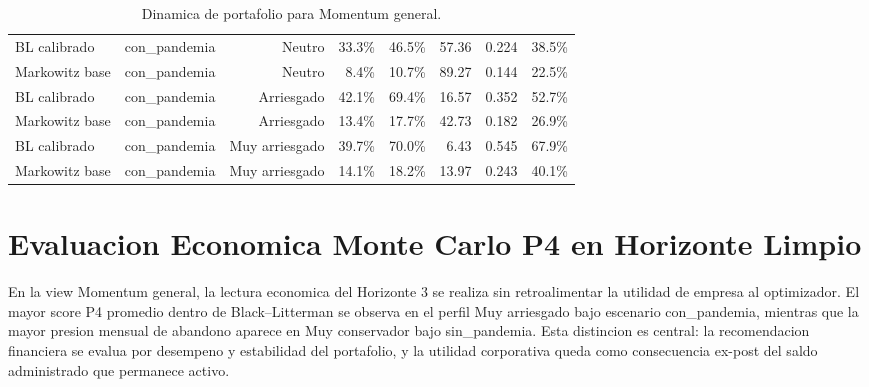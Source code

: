 \documentclass[11pt]{article}
\begin{document}
\begin{table}[H]
{\begin{tabular}{lrrrrrrr}
BL calibrado & con\_pandemia & Neutro & 33.3\% & 46.5\% & 57.36 & 0.224 & 38.5\% \\
Markowitz base & con\_pandemia & Neutro & 8.4\% & 10.7\% & 89.27 & 0.144 & 22.5\% \\
BL calibrado & con\_pandemia & Arriesgado & 42.1\% & 69.4\% & 16.57 & 0.352 & 52.7\% \\
Markowitz base & con\_pandemia & Arriesgado & 13.4\% & 17.7\% & 42.73 & 0.182 & 26.9\% \\
BL calibrado & con\_pandemia & Muy arriesgado & 39.7\% & 70.0\% & 6.43 & 0.545 & 67.9\% \\
Markowitz base & con\_pandemia & Muy arriesgado & 14.1\% & 18.2\% & 13.97 & 0.243 & 40.1\% \\
\bottomrule
\end{tabular}
}
\caption{Dinamica de portafolio para Momentum general.}
\label{tab:dinamica_momentum_general_v1_plus}
\end{table}


\section{Evaluacion Economica Monte Carlo P4 en Horizonte Limpio}

En la view Momentum general, la lectura economica del Horizonte 3 se realiza sin retroalimentar la utilidad de empresa al optimizador. El mayor score P4 promedio dentro de Black--Litterman se observa en el perfil Muy arriesgado bajo escenario con\_pandemia, mientras que la mayor presion mensual de abandono aparece en Muy conservador bajo sin\_pandemia. Esta distincion es central: la recomendacion financiera se evalua por desempeno y estabilidad del portafolio, y la utilidad corporativa queda como consecuencia ex-post del saldo administrado que permanece activo.
\end{document}
